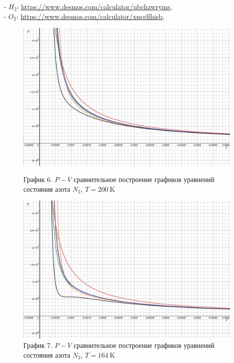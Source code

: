 \documentclass[a4paper]{article}
\numberwithin{equation}{subsection} %
\begin{document}
- $H_2$: \href{https://www.desmos.com/calculator/ubchzwryms}{https://www.desmos.com/calculator/ubchzwryms},\\
- $O_2$: \href{https://www.desmos.com/calculator/xncelfhisb}{https://www.desmos.com/calculator/xncelfhisb},\\
\begin{figure}[h!]
    \centering
    \begin{minipage}{0.49\textwidth}
        \centering
        \includegraphics[width=\linewidth]{Graphics/N2/200.png}
        \caption{\label{fig:clausius_1}График 6. $P-V$ сравнительное построение графиков уравнений состояния азота $N_2$, $T = 200 \ \text{K}$}
    \end{minipage}
    \hfill
    \begin{minipage}{0.49\textwidth}
        \centering
        \includegraphics[width=\linewidth]{Graphics/N2/164.png}
        \caption{\label{fig:clausius_1}График 7. $P-V$ сравнительное построение графиков уравнений состояния азота $N_2$, $T = 164 \ \text{K}$}
    \end{minipage}
\end{figure}
\end{document}
